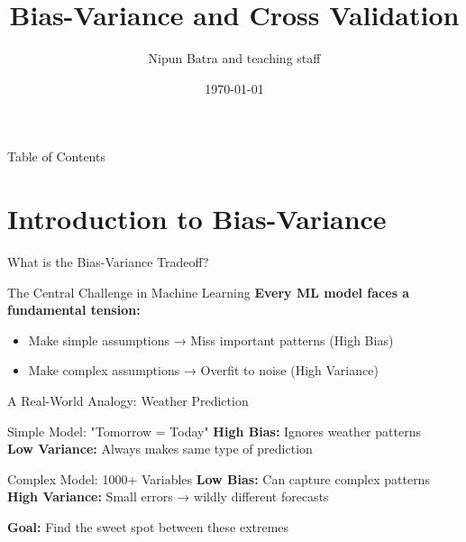 \documentclass{beamer}
\title{Bias-Variance and Cross Validation}
\date{\today}
\author{Nipun Batra and teaching staff}
\institute{IIT Gandhinagar}
\begin{document}
\maketitle

\begin{frame}{Table of Contents}
\tableofcontents
\end{frame}

\section{Introduction to Bias-Variance}

\begin{frame}{What is the Bias-Variance Tradeoff?}
\begin{alertbox}{The Central Challenge in Machine Learning}
\textbf{Every ML model faces a fundamental tension:}
\begin{itemize}
\item Make simple assumptions → Miss important patterns (High Bias)
\item Make complex assumptions → Overfit to noise (High Variance)
\end{itemize}
\end{alertbox}


\end{frame}

\begin{frame}{A Real-World Analogy: Weather Prediction}
\begin{examplebox}{Simple Model: "Tomorrow = Today"}
\textbf{High Bias:} Ignores weather patterns \\
\textbf{Low Variance:} Always makes same type of prediction
\end{examplebox}

\begin{examplebox}{Complex Model: 1000+ Variables}
\textbf{Low Bias:} Can capture complex patterns \\
\textbf{High Variance:} Small errors → wildly different forecasts
\end{examplebox}

\textbf{Goal:} Find the sweet spot between these extremes
\end{frame}
\end{document}
